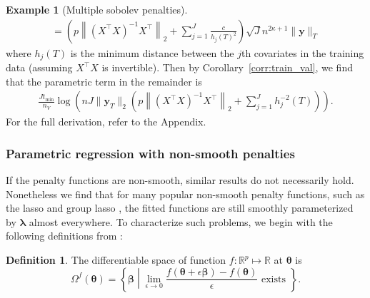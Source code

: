 \documentclass[12pt]{article} %
\theoremstyle{definition}
\newtheorem{definition}{Definition}
\newtheorem{example}{Example}
\begin{document}
\begin{example}[Multiple sobolev penalties]
\begin{align}
	=
	\left(
	p
	\left \|
	\left(
	X^\top X
	\right)^{-1}
	X^\top
	\right \|_2
	+
	\sum_{j=1}^J \frac{c }{h_j(T)^2}
	\right)
	\sqrt{J}
	n^{2\kappa + 1}
	\|\boldsymbol{y}\|_T
	\label{eq:sobolev_lipschitz}
	\end{align}
	where $h_j(T)$ is the minimum distance between the $j$th covariates in the training data (assuming $X^\top X$ is invertible).
	Then by Corollary~\ref{corr:train_val}, we find that the parametric term in the remainder is
	\begin{align}
	\frac{J t_{\min}}{n_{V}} \log \left (
	n
	J
	\|\boldsymbol{y}_T\|_2
	\left(
	p
	\left \|
	\left(
	X^\top X
	\right)^{-1}
	X^\top
	\right \|_2
	+
	\sum_{j=1}^J h_j^{-2}(T)
	\right)
	\right ).
	\label{eq:sobolev_param}
	\end{align}
	For the full derivation, refer to the Appendix.
\end{example}

\subsubsection{Parametric regression with non-smooth penalties}
\label{sec:param_nonsmooth}

If the penalty functions are non-smooth, similar results do not necessarily hold. Nonetheless we find that for many popular non-smooth penalty functions, such as the lasso \citep{tibshirani1996regression} and group lasso \citep{yuan2006model}, the fitted functions are still smoothly parameterized by $\boldsymbol \lambda$ almost everywhere.
To characterize such problems, we begin with the following definitions from \citet{feng2017gradient}:

\begin{definition}
	The differentiable space of function $f:\mathbb{R}^p \mapsto \mathbb{R}$ at $\boldsymbol{\theta}$ is
	\begin{equation}
	\Omega^{f}(\boldsymbol{\theta}) = \left \{ \boldsymbol{\beta} \middle | \lim_{\epsilon \rightarrow 0} \frac{f(\boldsymbol{\theta} + \epsilon \boldsymbol{\beta}) - f(\boldsymbol{\theta})}{\epsilon} \text{ exists } \right \}.
	\end{equation}
\end{definition}
\end{document}
